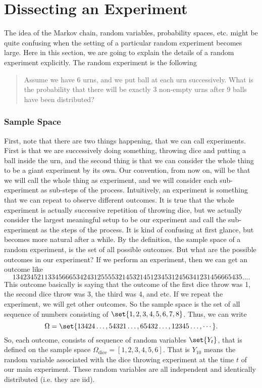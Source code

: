 \section{Dissecting an Experiment}
The idea of the Markov chain, random variables, probability spaces, etc. might be quite confusing when the setting of a particular random experiment becomes large. Here in this section, we are going to explain the details of a random experiment explicitly. The random experiment is the following
\begin{quote}
	Assume we have 6 urns, and we put ball at each urn successively. What is the probability that there will be exactly 3 non-empty urns after 9 balls have been distributed?
\end{quote}

\subsubsection{Sample Space}
First, note that there are two things happening, that we can call experiments. First is that we are successively doing something, throwing dice and putting a ball inside the urn, and the second thing is that we can consider the whole thing to be a giant experiment by its own. Our convention, from now on, will be that we will call the whole thing as experiment, and we will consider each sub-experiment as sub-steps of the process. Intuitively, an experiment is something that we can repeat to observe different outcomes. It is true that the whole experiment is actually successive repetition of throwing dice, but we actually consider the largest meaningful setup to be our experiment and call the sub-experiment as the steps of the process. It is kind of confusing at first glance, but becomes more natural after a while. By the definition, the sample space of a random experiment, is the set of all possible outcomes. But what are the possible outcomes in our experiment? If we perform an experiment, then we can get an outcome like 
\[ 13423452113345666534243125555321453214512345312456341231456665435\hdots. \]
This outcome basically is saying that the outcome of the first dice throw was 1, the second dice throw was 3, the third was 4, and etc. If we repeat the experiment, we will get other outcomes. So the sample space is the set of all sequence of numbers consisting of $ \set{1,2,3,4,5,6,7,8} $. Thus, we can write
\[ \Omega = \set{13424\hdots, 54321\hdots, 65432\hdots, 12345\hdots, \cdots}. \]
So, each outcome, consists of sequence of random variables $ \set{Y_t} $, that is defined on the sample space $ \Omega_{\text{dice}} = [1,2,3,4,5,6] $. That is $ Y_{10} $ means the random variable associated with the dice throwing experiment at the time $ t $ of our main experiment. These random variables are all independent and identically distributed (i.e. they are iid).

